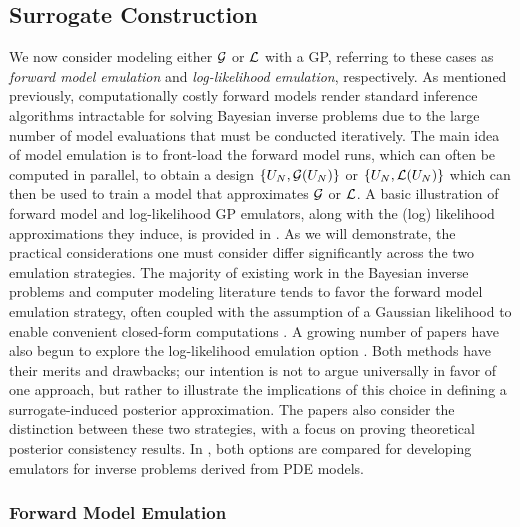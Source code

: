 \documentclass[12pt]{article}
\begin{document}
\subsection{Surrogate Construction}
We now consider modeling either $\mathcal{G}$ or $\mathcal{L}$ with a GP, referring to these cases as \textit{forward model emulation} and 
\textit{log-likelihood emulation}, respectively. As mentioned previously, computationally costly forward models render 
standard inference algorithms intractable for solving Bayesian inverse problems due to the large number of model 
evaluations that must be conducted iteratively. The main idea of model emulation is to front-load the forward model 
runs, which can often be computed in parallel, to obtain a design $\{U_{N}, \mathcal{G}(U_{N})\}$ or 
$\{U_{N}, \mathcal{L}(U_{N})\}$ which can then be used to train a model that 
approximates $\mathcal{G}$ or $\mathcal{L}$. A basic illustration of forward model and log-likelihood GP emulators, along with the 
(log) likelihood approximations they induce, is provided in . 
As we will demonstrate, the practical considerations one must consider differ significantly across the two emulation 
strategies. The majority of existing work in the Bayesian inverse problems and computer modeling literature tends 
to favor the forward model emulation strategy, often coupled with the assumption of a Gaussian likelihood to enable
convenient closed-form computations \citep{HigdonBasis,functionValuedModels,hydrologicalModel,VillaniAdaptiveGP}. 
A growing number of papers have also begun to explore the log-likelihood emulation option 
\citep{VehtariParallelGP,gp_surrogates_random_exploration,FerEmulation,ActiveLearningMCMC,quantileApprox,llikRBF,trainDynamics,MCMC_GP_proposal,landslideCalibration,Kandasamy_2017,wang2018adaptive}. 
Both methods have their merits and drawbacks; our intention is not to argue universally in favor of one approach, but rather
to illustrate the implications of this choice in defining a surrogate-induced posterior approximation. The papers 
\citet{StuartTeck1,StuartTeck2,random_fwd_models} also consider the distinction between these two strategies, 
with a focus on proving theoretical posterior consistency results. In \citet{GP_PDE_priors}, both options are compared 
for developing emulators for inverse problems derived from PDE models.

\subsubsection{Forward Model Emulation}
\end{document}
